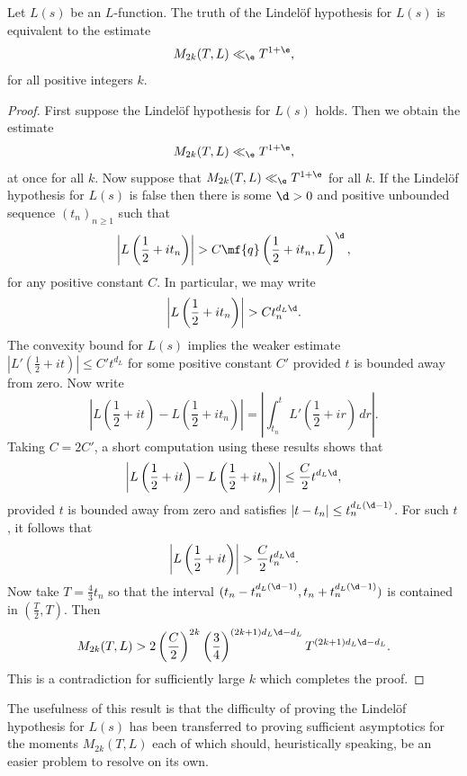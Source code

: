 \documentclass[12pt]{article}
\begin{document}
      \begin{proposition}\label{prop:equivalence_Lindelof_hypothesis_and_moments}
        Let \(L(s)\) be an \(L\)-function. The truth of the Lindel\"of hypothesis for \(L(s)\) is equivalent to the estimate
        \[
          M_{2k}(T,L) \ll_{\e} T^{1+\e},
        \]
        for all positive integers \(k\).
      \end{proposition}
      \begin{proof}
        First suppose the Lindel\"of hypothesis for \(L(s)\) holds. Then we obtain the estimate
        \[
          M_{2k}(T,L) \ll_{\e} T^{1+\e},
        \]
        at once for all \(k\). Now suppose that \(M_{2k}(T,L) \ll_{\e} T^{1+\e}\) for all \(k\). If the Lindel\"of hypothesis for \(L(s)\) is false then there is some \(\d > 0\) and positive unbounded sequence \((t_{n})_{n \ge 1}\) such that
        \[
          \left|L\left(\frac{1}{2}+it_{n}\right)\right| > C\mf{q}\left(\frac{1}{2}+it_{n},L\right)^{\d},
        \]
        for any positive constant \(C\). In particular, we may write
          \[
          \left|L\left(\frac{1}{2}+it_{n}\right)\right| > Ct_{n}^{d_{L}\d}.
        \]
        The convexity bound for \(L(s)\) implies the weaker estimate \(\left|L'\left(\frac{1}{2}+it\right)\right| \le C't^{d_{L}}\) for some positive constant \(C'\) provided \(t\) is bounded away from zero. Now write
        \[
          \left|L\left(\frac{1}{2}+it\right)-L\left(\frac{1}{2}+it_{n}\right)\right| = \left|\int_{t_{n}}^{t}L'\left(\frac{1}{2}+ir\right)\,dr\right|.
        \]
        Taking \(C = 2C'\), a short computation using these results shows that
        \[
          \left|L\left(\frac{1}{2}+it\right)-L\left(\frac{1}{2}+it_{n}\right)\right| \le \frac{C}{2}t^{d_{L}\d},
        \]
        provided \(t\) is bounded away from zero and satisfies \(|t-t_{n}| \le t_{n}^{d_{L}(\d-1)}\). For such \(t\), it follows that
        \[
          \left|L\left(\frac{1}{2}+it\right)\right| > \frac{C}{2}t_{n}^{d_{L}\d}.
        \]
        Now take \(T = \frac{4}{3}t_{n}\) so that the interval \((t_{n}-t_{n}^{d_{L}(\d-1)},t_{n}+t_{n}^{d_{L}(\d-1)})\) is contained in \(\left(\frac{T}{2},T\right)\). Then
        \[
          M_{2k}(T,L) > 2\left(\frac{C}{2}\right)^{2k}\left(\frac{3}{4}\right)^{(2k+1)d_{L}\d-d_{L}}T^{(2k+1)d_{L}\d-d_{L}}.
        \]
        This is a contradiction for sufficiently large \(k\) which completes the proof.
      \end{proof}

      The usefulness of this result is that the difficulty of proving the Lindel\"of hypothesis for \(L(s)\) has been transferred to proving sufficient asymptotics for the moments \(M_{2k}(T,L)\) each of which should, heuristically speaking, be an easier problem to resolve on its own.
\end{document}
